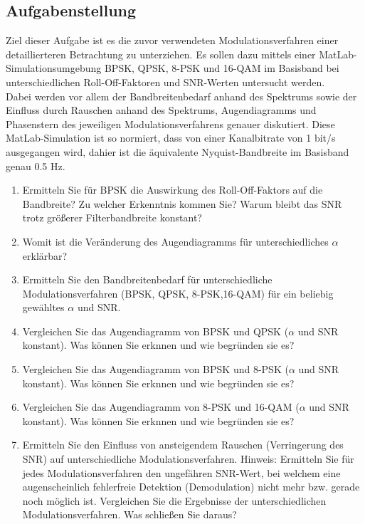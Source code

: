 \documentclass[12pt,a4paper,ngerman]{article}
\begin{document}
\subsection{Aufgabenstellung}
Ziel dieser Aufgabe ist es die zuvor verwendeten Modulationsverfahren einer detaillierteren Betrachtung zu unterziehen. Es sollen dazu mittels einer  MatLab-Simulationsumgebung BPSK, QPSK, 8-PSK und 16-QAM im Basisband bei unterschiedlichen Roll-Off-Faktoren und SNR-Werten untersucht werden. \\
Dabei werden vor allem der Bandbreitenbedarf anhand des Spektrums sowie der Einfluss durch Rauschen anhand des Spektrums, Augendiagramms und Phasenstern des jeweiligen Modulationsverfahrens genauer diskutiert. Diese MatLab-Simulation ist so normiert, dass von einer Kanalbitrate von 1 bit/s ausgegangen wird, dahier ist die äquivalente Nyquist-Bandbreite im Basisband genau 0.5 Hz. \\
\begin{enumerate}
\item Ermitteln Sie für BPSK die Auswirkung des Roll-Off-Faktors auf die Bandbreite? Zu welcher Erkenntnis kommen Sie? Warum bleibt das SNR trotz größerer Filterbandbreite konstant?

\item Womit ist die Veränderung des Augendiagramms für unterschiedliches $\alpha$ erklärbar?
\item Ermitteln Sie den Bandbreitenbedarf für unterschiedliche Modulationsverfahren (BPSK, QPSK, 8-PSK,16-QAM) für ein beliebig gewähltes $\alpha$ und SNR.
\item Vergleichen Sie das Augendiagramm von BPSK und QPSK ($\alpha$ und SNR konstant). Was können Sie erknnen und wie begründen sie es?
\item Vergleichen Sie das Augendiagramm von BPSK und 8-PSK ($\alpha$ und SNR konstant). Was können Sie erknnen und wie begründen sie es?
\item Vergleichen Sie das Augendiagramm von 8-PSK und 16-QAM ($\alpha$ und SNR konstant). Was können Sie erknnen und wie begründen sie es?
\item  Ermitteln Sie den Einfluss von ansteigendem Rauschen (Verringerung des SNR) auf unterschiedliche Modulationsverfahren. Hinweis: Ermitteln Sie für jedes Modulationsverfahren den ungefähren SNR-Wert, bei welchem eine augenscheinlich fehlerfreie Detektion (Demodulation) nicht mehr bzw. gerade noch möglich ist. Vergleichen Sie die Ergebnisse der unterschiedlichen Modulationsverfahren. Was schließen Sie daraus? 
\end{enumerate}
\end{document}
